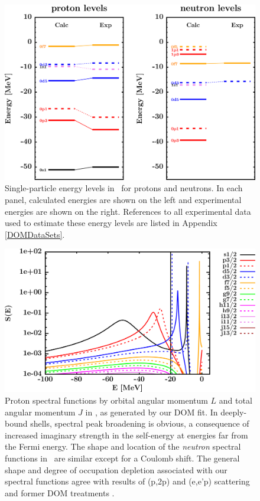 \begin{figure}[tb]
    \centering
    \includegraphics[width=\textwidth]{figures/ca40_SPLevels.png}
    \caption[Single-particle levels in \caForty]
    {
        Single-particle energy levels in \caForty\ for protons and neutrons.
        In each panel, calculated energies are shown on the left and
        experimental energies are shown on the right. References to all
        experimental data used to estimate these energy levels are
        listed in Appendix \ref{DOMDataSets}.
    }
    \label{Ca40SPLevels}
\end{figure}

\begin{figure}[tb]
    \centering
    \includegraphics[width=\textwidth]{figures/ca40_protonSpectralFunctions.png}
    \caption[Proton spectral functions in \caForty]
    {
        Proton spectral functions by orbital angular momentum $L$ and total
        angular momentum $J$ in \caForty, as generated by our DOM fit.
        In deeply-bound shells,
        spectral peak broadening is obvious, a consequence of increased
        imaginary strength in the self-energy at energies far from the
        Fermi energy. The shape and location of the \textit{neutron} spectral
        functions in \caForty\ are similar except for a Coulomb shift. The
        general shape and degree of occupation depletion associated with our spectral
        functions agree with results of (p,2p) and (e,e'p) scattering
        and former DOM treatments \cite{MahzoonPhDThesis}.
    }
    \label{Ca40SpectralFunctions}
\end{figure}

